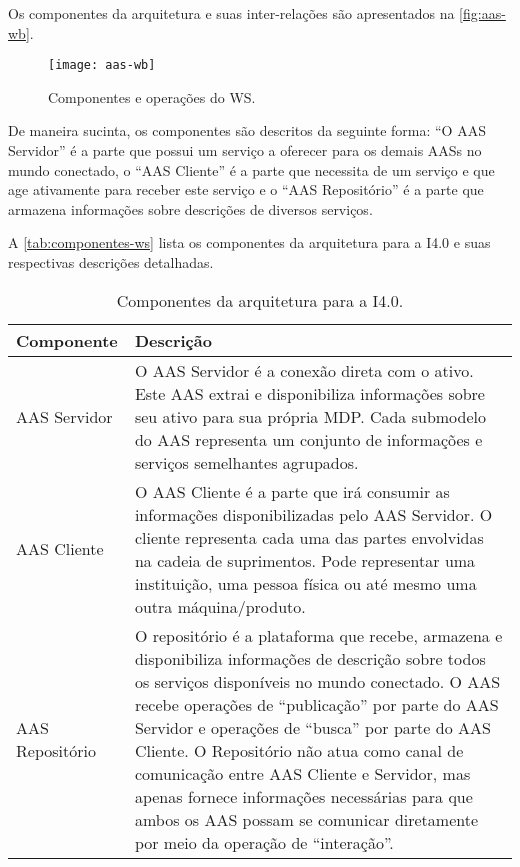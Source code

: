 	Os componentes da arquitetura e suas inter-relações são apresentados na \autoref{fig:aas-wb}.
	
	\begin{figure}[htb]
		\centering
		\caption{Componentes e operações do WS.}
		\label{fig:aas-wb}
		\texttt{[image: aas-wb]}
	\end{figure}

	De maneira sucinta, os componentes são descritos da seguinte forma: ``O AAS Servidor'' é a parte que possui um serviço a oferecer para os demais AASs no mundo conectado, o ``AAS Cliente'' é a parte que necessita de um serviço e que age ativamente para receber este serviço e o ``AAS Repositório'' é a parte que armazena informações sobre descrições de diversos serviços.
	
	A \autoref{tab:componentes-ws} lista os componentes da arquitetura para a I4.0 e suas respectivas descrições detalhadas.
	
	\begin{table}[htb]
		\centering
		\caption{Componentes da arquitetura para a I4.0.}
		\label{tab:componentes-ws}
		\begin{tabular}{p{3cm}p{12cm}}
			\hline
			\textbf{Componente}
			& \textbf{Descrição} \\ 
			
			\hline
			AAS Servidor
			& O AAS Servidor é a conexão direta com o ativo. Este AAS extrai e disponibiliza informações sobre seu ativo para sua própria MDP. Cada submodelo do AAS representa um conjunto de informações e serviços semelhantes agrupados. \\
			
			\hline
			AAS Cliente
			& O AAS Cliente é a parte que irá consumir as informações disponibilizadas pelo AAS Servidor. O cliente representa cada uma das partes envolvidas na cadeia de suprimentos. Pode representar uma instituição, uma pessoa física ou até mesmo uma outra máquina/produto. \\
			
			\hline
			AAS Repositório
			& O repositório é a plataforma que recebe, armazena e disponibiliza informações de descrição sobre todos os serviços disponíveis no mundo conectado. O AAS recebe operações de ``publicação'' por parte do AAS Servidor e operações de ``busca'' por parte do AAS Cliente. O Repositório não atua como canal de comunicação entre AAS Cliente e Servidor, mas apenas fornece informações necessárias para que ambos os AAS possam se comunicar diretamente por meio da operação de ``interação''. \\
			
			\hline
		\end{tabular}
	\end{table}
	
